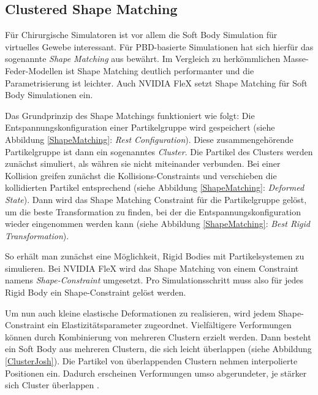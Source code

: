 \subsection{Clustered Shape Matching}

Für Chirurgische Simulatoren ist vor allem die Soft Body Simulation für virtuelles Gewebe interessant. Für PBD-basierte Simulationen hat sich hierfür das sogenannte \textit{Shape Matching} aus \cite{Shape} bewährt. Im Vergleich zu herkömmlichen Masse-Feder-Modellen ist Shape Matching deutlich performanter und die Parametrisierung ist leichter. Auch NVIDIA FleX setzt Shape Matching für Soft Body Simulationen ein. 




Das Grundprinzip des Shape Matchings funktioniert wie folgt:
Die Entspannungskonfiguration einer Partikelgruppe wird gespeichert (siehe Abbildung \ref{ShapeMatching}: \textit{Rest Configuration}). Diese zusammengehörende Partikelgruppe ist dann ein sogenanntes \textit{Cluster}. 
Die Partikel des Clusters werden zunächst simuliert, als währen sie nicht miteinander verbunden.
Bei einer Kollision greifen zunächst die Kollisions-Constraints und verschieben die kollidierten Partikel entsprechend (siehe Abbildung \ref{ShapeMatching}: \linebreak \textit{Deformed State}). Dann wird das Shape Matching Constraint für die Partikelgruppe gelöst, um die beste Transformation zu finden, bei der die Entspannungskonfiguration wieder eingenommen werden kann (siehe Abbildung \ref{ShapeMatching}: \textit{Best Rigid Transformation}).

So erhält man zunächst eine Möglichkeit, Rigid Bodies mit Partikelsystemen zu simulieren. Bei NVIDIA FleX wird das Shape Matching von einem Constraint namens \textit{Shape-Constraint} umgesetzt. Pro Simulationsschritt muss also für jedes Rigid Body ein Shape-Constraint gelöst werden.

Um nun auch kleine elastische Deformationen zu realisieren, wird jedem Shape-Constraint ein 
Elastizitätsparameter
zugeordnet. Vielfältigere Verformungen können durch Kombinierung von mehreren Clustern erzielt werden. Dann besteht ein Soft Body aus mehreren Clustern, die sich leicht überlappen (siehe Abbildung \ref{ClusterJosh}). Die Partikel von überlappenden Clustern nehmen interpolierte Positionen ein. Dadurch erscheinen Verformungen umso abgerundeter, je stärker sich Cluster überlappen \cite{FlexDoc}.


